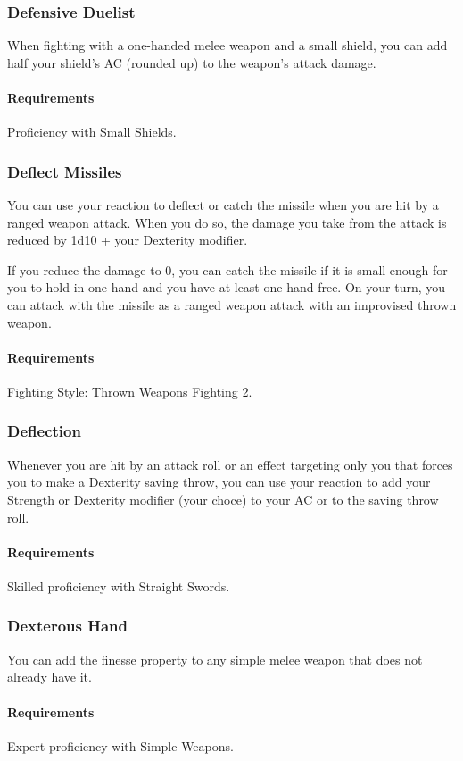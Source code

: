 \subsubsection{Defensive Duelist} \label{feat::defensiveduelist}
    When fighting with a one-handed melee weapon and a small shield, you can add half your shield's AC (rounded up) to the weapon's attack damage.
    \paragraph{Requirements} Proficiency with Small Shields.
\subsubsection{Deflect Missiles} \label{feat::deflectmissiles}
    You can use your reaction to deflect or catch the missile when you are hit by a ranged weapon attack.
    When you do so, the damage you take from the attack is reduced by 1d10 + your Dexterity modifier.

    If you reduce the damage to 0, you can catch the missile if it is small enough for you to hold in one hand and you have at least one hand free.
    On your turn, you can attack with the missile as a ranged weapon attack with an improvised thrown weapon.
    \paragraph{Requirements} Fighting Style: Thrown Weapons Fighting 2.
\subsubsection{Deflection} \label{feat::deflection}
    Whenever you are hit by an attack roll or an effect targeting only you that forces you to make a Dexterity saving throw, you can use your reaction to add your Strength or Dexterity modifier (your choce) to your AC or to the saving throw roll.
    \paragraph{Requirements} Skilled proficiency with Straight Swords.
\subsubsection{Dexterous Hand} \label{feat::dexteroushand}
    You can add the finesse property to any simple melee weapon that does not already have it.
    \paragraph{Requirements} Expert proficiency with Simple Weapons.

